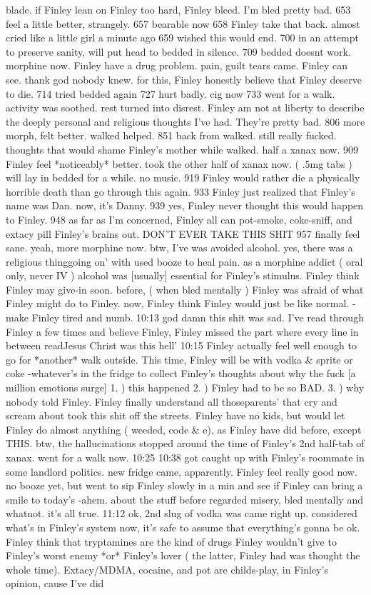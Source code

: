 \documentclass[12pt]{book}
\begin{document}
blade. if Finley lean on Finley too hard, Finley bleed. I'm bled pretty bad. 653 feel a little better, strangely. 657 bearable now 658 Finley take that back. almost cried like a little girl a minute ago 659 wished this would end. 700 in an attempt to preserve sanity, will put head to bedded in silence. 709 bedded doesnt work. morphine now. Finley have a drug problem. pain, guilt tears came. Finley can see. thank god nobody knew. for this, Finley honestly believe that Finley deserve to die. 714 tried bedded again 727 hurt badly. cig now 733 went for a walk. activity was soothed. rest turned into disrest. Finley am not at liberty to describe the deeply personal and religious thoughts I've had. They're pretty bad. 806 more morph, felt better. walked helped. 851 back from walked. still really fucked. thoughts that would shame Finley's mother while walked. half a xanax now. 909 Finley feel *noticeably* better. took the other half of xanax now. ( .5mg tabs ) will lay in bedded for a while. no music. 919 Finley would rather die a physically horrible death than go through this again. 933 Finley just realized that Finley's name was Dan. now, it's Danny. 939 yes, Finley never thought this would happen to Finley. 948 as far as I'm concerned, Finley all can pot-smoke, coke-sniff, and extacy pill Finley's brains out. DON'T EVER TAKE THIS SHIT 957 finally feel sane. yeah, more morphine now. btw, I've was avoided alcohol. yes, there was a religious thinggoing on' with used booze to heal pain. as a morphine addict ( oral only, never IV ) alcohol was [usually] essential for Finley's stimulus. Finley think Finley may give-in soon. before, ( when bled mentally ) Finley was afraid of what Finley might do to Finley. now, Finley think Finley would just be like normal. -make Finley tired and numb. 10:13 god damn this shit was sad. I've read through Finley a few times and believe Finley, Finley missed the part where every line in between readJesus Christ was this hell' 10:15 Finley actually feel well enough to go for *another* walk outside. This time, Finley will be with vodka \& sprite or coke -whatever's in the fridge to collect Finley's thoughts about why the fuck [a million emotions surge] 1. ) this happened 2. ) Finley had to be so BAD. 3. ) why nobody told Finley. Finley finally understand all thoseparents' that cry and scream about took this shit off the streets. Finley have no kids, but would let Finley do almost anything ( weeded, code \& e), as Finley have did before, except THIS. btw, the hallucinations stopped around the time of Finley's 2nd half-tab of xanax. went for a walk now. 10:25 10:38 got caught up with Finley's roommate in some landlord politics. new fridge came, apparently. Finley feel really good now. no booze yet, but went to sip Finley slowly in a min and see if Finley can bring a smile to today's -ahem. about the stuff before regarded misery, bled mentally and whatnot. it's all true. 11:12 ok, 2nd slug of vodka was came right up. considered what's in Finley's system now, it's safe to assume that everything's gonna be ok. Finley think that tryptamines are the kind of drugs Finley wouldn't give to Finley's worst enemy *or* Finley's lover ( the latter, Finley had was thought the whole time). Extacy/MDMA, cocaine, and pot are childs-play, in Finley's opinion, cause I've did 
\end{document}
